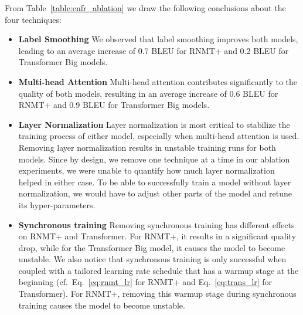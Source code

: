\documentclass[11pt,a4paper]{article}
\begin{document}
From Table~\ref{table:enfr_ablation} we draw the following conclusions about the
four techniques:
\begin{itemize}
\item \textbf{Label Smoothing}
We observed that label smoothing improves both models, leading to an
average increase of 0.7 BLEU for RNMT+ and 0.2 BLEU for Transformer Big models.
\item \textbf{Multi-head Attention}
Multi-head attention contributes significantly to the quality of
both models, resulting in an average increase of 0.6 BLEU for RNMT+ and 0.9 BLEU
for Transformer Big models.
\item \textbf{Layer Normalization}
Layer normalization is most critical to stabilize the
training process of either model, especially when multi-head attention is used.
Removing layer normalization results in unstable training runs for both models.
Since by design, we remove one technique at a time in our ablation experiments,
we were unable to quantify how much layer
normalization helped in either case. To be able to successfully train a model
without layer normalization, we would have to adjust other parts of the model
and retune its hyper-parameters.
\item \textbf{Synchronous training}
Removing synchronous training has different effects on RNMT+ and Transformer.
For RNMT+, it results in a significant quality drop, while for the
Transformer Big model, it causes the model to become unstable. We also
notice that synchronous training is only successful when coupled
with a tailored learning rate schedule that has a warmup stage at
the beginning (cf.~Eq.~\ref{eq:rnmt_lr} for RNMT+ and
Eq.~\ref{eq:trans_lr} for Transformer). For RNMT+, removing this
warmup stage during synchronous training causes the model to become
unstable.
\end{itemize}
\end{document}
